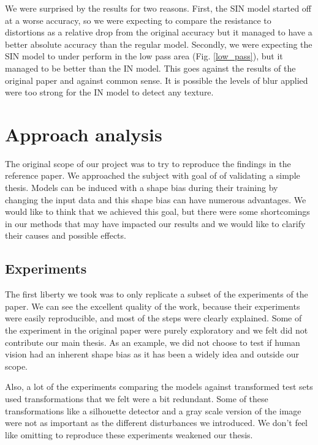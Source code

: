 \documentclass{article}
\begin{document}
We were surprised by the results for two reasons.
First, the SIN model started off at a worse accuracy, so we were expecting to compare the resistance to distortions as a relative drop from the original accuracy but it managed to have a better absolute accuracy than the regular model.
Secondly, we were expecting the SIN model to under perform in the low pass area (Fig. \ref{low_pass}), but it managed to be better than the IN model. 
This goes against the results of the original paper and against common sense. 
It is possible the levels of blur applied were too strong for the IN model to detect any texture.

\section{Approach analysis}

The original scope of our project was to try to reproduce the findings in the reference paper.
We approached the subject with goal of of validating a simple thesis. Models can be induced with a shape bias during their training by changing the input data and this shape bias can have numerous advantages.
We would like to think that we achieved this goal, but there were some shortcomings in our methods that may have impacted our results and we would like to clarify their causes and possible effects.

\subsection{Experiments}

The first liberty we took was to only replicate a subset of the experiments of the paper.
We can see the excellent quality of the work, 
because their experiments were easily reproducible, and most of the 
steps were clearly explained.
Some of the experiment in the original paper were purely exploratory and we felt did not contribute our main thesis. As an example, we did not choose to test if human vision had an inherent shape bias as it has been a widely idea and outside our scope.

Also, a lot of the experiments comparing the models against transformed test sets used transformations that we felt were a bit redundant. Some of these transformations like a silhouette detector and a gray scale version of the image were not as important as the different disturbances we introduced.
We don't feel like omitting to reproduce these experiments weakened our thesis.\\
\end{document}
